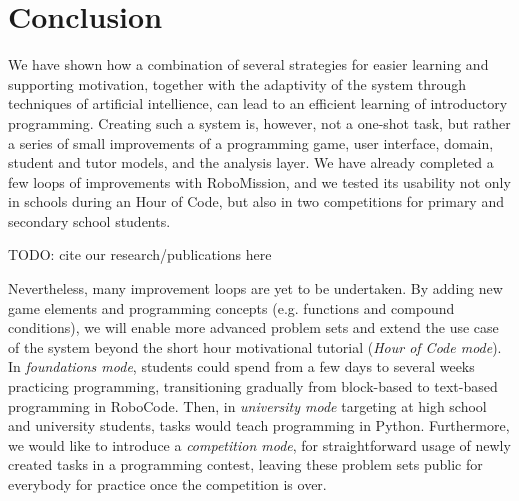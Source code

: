 \chapter{Conclusion}
\label{chap:conclusion}


We have shown how a combination of several strategies for easier learning and
supporting motivation, together with the adaptivity of the system
through techniques of artificial intellience,
can lead to an efficient learning of introductory programming. %
Creating such a system is, however, not a one-shot task, but rather a series
of small improvements of a programming game, user interface,
domain, student and tutor models, and the analysis layer.
We have already completed a few loops of improvements with
RoboMission,
and we tested its usability not only in schools during an Hour of Code,
but also in two competitions for primary and secondary school students. %

TODO: cite our research/publications here



Nevertheless, many improvement loops are yet to be undertaken. By adding
new game elements and programming concepts (e.g. functions and compound
conditions), we will enable more advanced problem sets and extend the use
case of the system beyond the short hour motivational tutorial (\emph{Hour of Code mode}).  %
In \emph{foundations mode}, students could spend from a few days to several weeks practicing
programming, transitioning gradually from block-based to text-based programming
in RoboCode.
Then, in \emph{university mode} targeting at high school and university students,
tasks would teach programming in Python.
Furthermore, we would like to introduce a \emph{competition mode}, for
straightforward usage of newly created tasks in a programming contest,
leaving these problem sets public for everybody for practice once the
competition is over.

